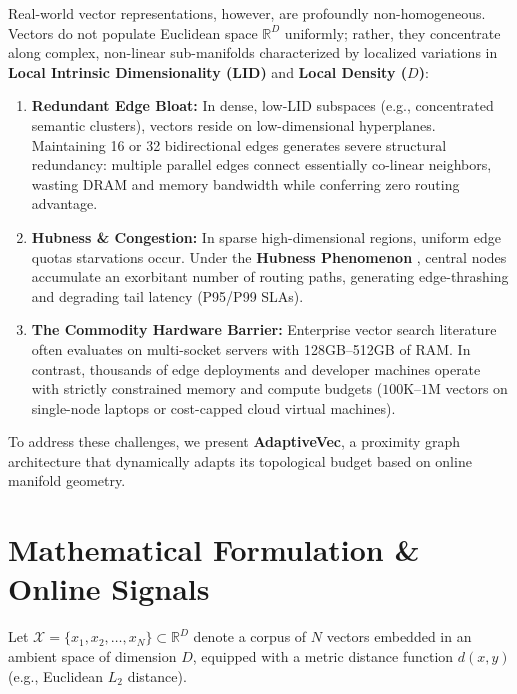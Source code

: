 \documentclass[conference,10pt]{IEEEtran}
\begin{document}
Real-world vector representations, however, are profoundly non-homogeneous. Vectors do not populate Euclidean space $\mathbb{R}^D$ uniformly; rather, they concentrate along complex, non-linear sub-manifolds characterized by localized variations in \textbf{Local Intrinsic Dimensionality (LID)} and \textbf{Local Density ($D$)}:
\begin{enumerate}
    \item \textbf{Redundant Edge Bloat:} In dense, low-LID subspaces (e.g., concentrated semantic clusters), vectors reside on low-dimensional hyperplanes. Maintaining 16 or 32 bidirectional edges generates severe structural redundancy: multiple parallel edges connect essentially co-linear neighbors, wasting DRAM and memory bandwidth while conferring zero routing advantage.
    \item \textbf{Hubness \& Congestion:} In sparse high-dimensional regions, uniform edge quotas starvations occur. Under the \textbf{Hubness Phenomenon} \cite{radovanovic2010hubs}, central nodes accumulate an exorbitant number of routing paths, generating edge-thrashing and degrading tail latency (P95/P99 SLAs).
    \item \textbf{The Commodity Hardware Barrier:} Enterprise vector search literature often evaluates on multi-socket servers with 128GB--512GB of RAM. In contrast, thousands of edge deployments and developer machines operate with strictly constrained memory and compute budgets ($100\text{K}$--$1\text{M}$ vectors on single-node laptops or cost-capped cloud virtual machines).
\end{enumerate}

To address these challenges, we present \textbf{AdaptiveVec}, a proximity graph architecture that dynamically adapts its topological budget based on online manifold geometry.

\section{Mathematical Formulation \& Online Signals}
Let $\mathcal{X} = \{x_1, x_2, \dots, x_N\} \subset \mathbb{R}^D$ denote a corpus of $N$ vectors embedded in an ambient space of dimension $D$, equipped with a metric distance function $d(x, y)$ (e.g., Euclidean $L_2$ distance).
\end{document}
